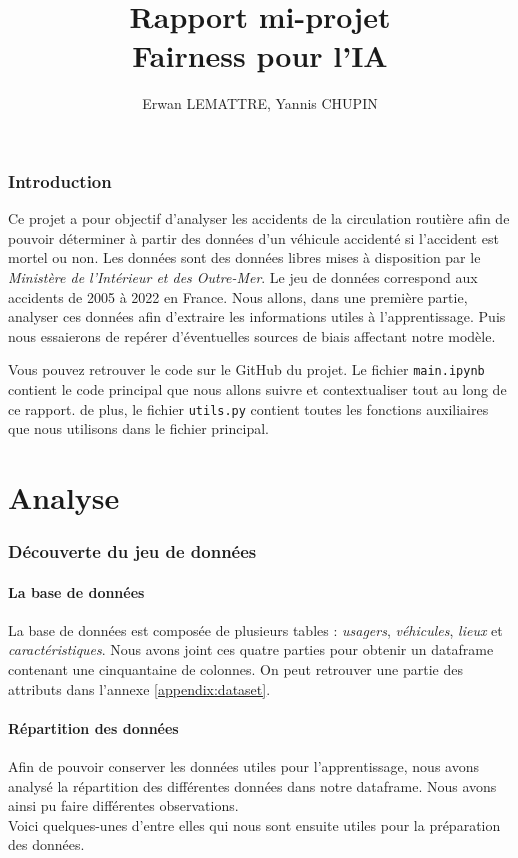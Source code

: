\documentclass{article}
\author{Erwan LEMATTRE, Yannis CHUPIN}
\title{Rapport mi-projet\\Fairness pour l'IA}
\begin{document}
    \maketitle
    \newpage
    \tableofcontents
    \newpage

    \section{Introduction}
    Ce projet a pour objectif d'analyser les accidents de la circulation routière afin de pouvoir déterminer 
    à partir des données d'un véhicule accidenté si l'accident est mortel ou non.
    Les données sont des données libres mises à disposition par le \textit{Ministère de l'Intérieur et des 
    Outre-Mer}. Le jeu de données correspond aux accidents de 2005 à 2022 en France. Nous allons, dans une première 
    partie, analyser ces données afin d'extraire les informations utiles à l'apprentissage. Puis nous essaierons de repérer 
    d'éventuelles sources de biais affectant notre modèle.
    
    Vous pouvez retrouver le code sur le GitHub du projet. Le fichier \texttt{main.ipynb} contient 
    le code principal que nous allons suivre et contextualiser tout au long de ce rapport. de plus, le fichier \texttt{utils.py} 
    contient toutes les fonctions auxiliaires que nous utilisons dans le fichier principal.

    \newpage
    \part{Analyse}
    \section{Découverte du jeu de données}
    \subsection{La base de données}
    La base de données est composée de plusieurs tables : \textit{usagers}, \textit{véhicules}, \textit{lieux} et 
    \textit{caractéristiques}. Nous avons joint ces quatre parties pour obtenir un dataframe contenant une 
    cinquantaine de colonnes. 
    On peut retrouver une partie des attributs dans l'annexe \ref{appendix:dataset}.


    \subsection{Répartition des données}
    Afin de pouvoir conserver les données utiles pour l'apprentissage, nous avons analysé la répartition des 
    différentes données dans notre dataframe.
    Nous avons ainsi pu faire différentes observations. 
    \\
    Voici quelques-unes d'entre elles qui nous sont ensuite utiles pour la préparation des données.
\end{document}
